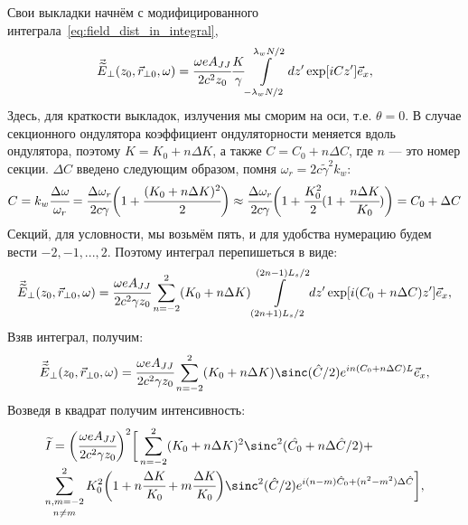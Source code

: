 Свои выкладки начнём с модифицированного интеграла~\ref{eq:field_dist_in_integral}, 
\begin{equation}
\begin{array}{lcl}
\vec{\widetilde{E}}_{\bot}(z_0,  \vec{r}_{\bot 0}, \omega) =
\cfrac{\omega eA_{JJ}}{2c^2z_0}\cfrac{K}{\gamma}
\displaystyle\int\limits_{-\lambda_w N/2}^{\lambda_w N/2} dz'
\exp[iCz'] 	\vec{e}_x,
\end{array}	
\end{equation} 
Здесь, для краткости выкладок, излучения мы сморим на оси, т.е. $\theta = 0$. В случае секционного ондулятора коэффициент ондуляторности меняется вдоль ондулятора, поэтому $K = K_0 + n\Delta K$, а также $C = C_0 + n\Delta C$, где $n$ --- это номер секции. $\Delta {C}$ введено следующим образом, помня $\omega_r = 2c\widetilde{\gamma}^2k_w$:
\begin{equation}
C =k_w\cfrac{\Delta \omega}{\omega_r} = \cfrac{\Delta \omega_r}{2c\gamma}\bigg(1 + \cfrac{(K_0 + n\Delta K)^2}{2}\bigg) \approx \cfrac{\Delta \omega_r}{2c\gamma}\bigg(1 + \cfrac{K^2_0}{2}(1 + \cfrac{n\Delta K}{K_0})\bigg) = C_0 + \Delta C
\end{equation} 
Секций, для условности, мы возьмём пять, и для удобства нумерацию будем вести $-2, -1, ... , 2$. Поэтому интеграл перепишеться в виде:
\begin{equation}
\begin{array}{lcl}
\vec{\widetilde{E}}_{\bot}(z_0,  \vec{r}_{\bot 0}, \omega) =
\cfrac{\omega eA_{JJ}}{2c^2 \gamma z_0}
\displaystyle\sum\limits_{n =-2}^{2}(K_0 + n\Delta K)
\displaystyle\int\limits_{(2n + 1)L_s/2}^{(2n - 1)L_s/2} dz'
\exp[i(C_0 + n\Delta C)z']	\vec{e}_x,
\end{array}	
\end{equation} 
Взяв интеграл, получим:
\begin{equation}
\begin{array}{lcl}
\vec{\widetilde{E}}_{\bot}(z_0,  \vec{r}_{\bot 0}, \omega) =
\cfrac{\omega eA_{JJ}}{2c^2 \gamma z_0}
\displaystyle\sum\limits_{n =-2}^{2}(K_0 + n\Delta K)
\sinc(\hat{C}/2)e^{in({C}_0 + n\Delta {C})L}	\vec{e}_x,
\end{array}	
\end{equation} 
Возведя в квадрат получим интенсивность:
\begin{equation}
\begin{array}{lcl}
{\widetilde{I}} =
\bigg(\cfrac{\omega eA_{JJ}}{2c^2 \gamma z_0}\bigg)^2\bigg[
\displaystyle\sum\limits_{n =-2}^{2}(K_0 + n\Delta K)^2\sinc^2(\hat{C_0} + n\Delta \hat{C}/2) + \\

\displaystyle\mathop{\sum\limits_{n, m =-2}^{2}}_{n \neq m}K^2_0\bigg(1 + n\cfrac{\Delta K}{K_0} + m\cfrac{\Delta K}{K_0}\bigg)
\sinc^2(\hat{C}/2)e^{i(n-m)\hat{C}_0 + (n^2 - m^2)\Delta \hat{C}}\bigg],
\end{array}	
\end{equation} 
